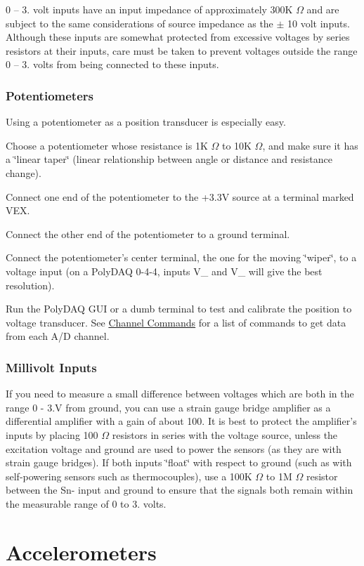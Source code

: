 0 -- 3. volt inputs have an input impedance of approximately 300\-K $\Omega$ and are subject to the same considerations of source impedance as the $\pm$ 10 volt inputs. Although these inputs are somewhat protected from excessive voltages by series resistors at their inputs, care must be taken to prevent voltages outside the range 0 -- 3. volts from being connected to these inputs.\hypertarget{pd_sensors_sec_pot}{}\subsubsection{Potentiometers}\label{pd_sensors_sec_pot}
Using a potentiometer as a position transducer is especially easy.
\begin{DoxyEnumerate}
\item Choose a potentiometer whose resistance is 1\-K $\Omega$ to 10\-K $\Omega$, and make sure it has a \char`\"{}linear taper\char`\"{} (linear relationship between angle or distance and resistance change).
\item Connect one end of the potentiometer to the +3.3\-V source at a terminal marked {\ttfamily V\-E\-X}.
\item Connect the other end of the potentiometer to a ground terminal.
\item Connect the potentiometer's center terminal, the one for the moving \char`\"{}wiper\char`\"{}, to a voltage input (on a Poly\-D\-A\-Q 0-\/4-\/4, inputs {\ttfamily V\-\_} and {\ttfamily V\-\_} will give the best resolution).
\item Run the Poly\-D\-A\-Q G\-U\-I or a dumb terminal to test and calibrate the position to voltage transducer. See \hyperlink{pd_channels}{Channel Commands} for a list of commands to get data from each A/\-D channel.
\end{DoxyEnumerate}\hypertarget{pd_sensors_sec_mV}{}\subsubsection{Millivolt Inputs}\label{pd_sensors_sec_mV}
If you need to measure a small difference between voltages which are both in the range 0 -\/ 3.\-V from ground, you can use a strain gauge bridge amplifier as a differential amplifier with a gain of about 100. It is best to protect the amplifier's inputs by placing 100 $\Omega$ resistors in series with the voltage source, unless the excitation voltage and ground are used to power the sensors (as they are with strain gauge bridges). If both inputs \char`\"{}float\char`\"{} with respect to ground (such as with self-\/powering sensors such as thermocouples), use a 100\-K $\Omega$ to 1\-M $\Omega$ resistor between the {\ttfamily Sn-\/} input and ground to ensure that the signals both remain within the measurable range of 0 to 3. volts.\hypertarget{pd_sensors_sec_accel}{}\section{Accelerometers}\label{pd_sensors_sec_accel}
